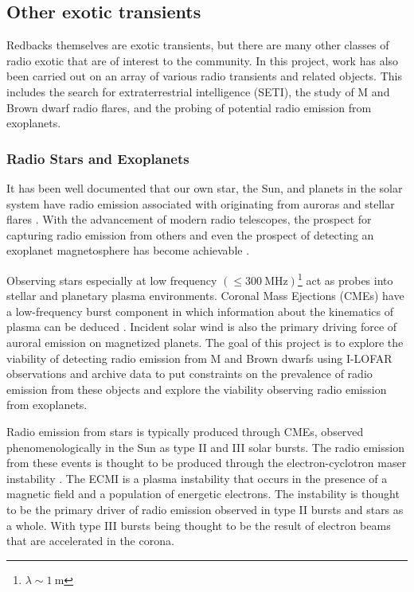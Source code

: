 \subsection{Other exotic transients}

Redbacks themselves are exotic transients, but there are many other classes of radio exotic that are of interest to the community. In this project, work has also been carried out on an array of various radio transients and related objects. This includes the search for extraterrestrial intelligence (SETI), the study of M and Brown dwarf radio flares, and the probing of potential radio emission from exoplanets.

\subsubsection{Radio Stars and Exoplanets}

It has been well documented that our own star, the Sun, and planets in the solar system have radio emission associated with originating from auroras and stellar flares \citep{murphy_lofar_2021, zarka_auroral_1998}. With the advancement of modern radio telescopes, the prospect for capturing radio emission from others and even the prospect of detecting an exoplanet magnetosphere has become achievable \citep{vedantham_coherent_2020}. \

Observing stars especially at low frequency $(\leq 300 \ \text{MHz})$\footnote{$\lambda \sim 1 \ \text{m}$} act as probes into stellar and planetary plasma environments. Coronal Mass Ejections (CMEs) have a low-frequency burst component in which information about the kinematics of plasma can be deduced \citep{villadsen_ultra-wideband_2019}. Incident solar wind is also the primary driving force of auroral emission on magnetized planets. The goal of this project is to explore the viability of detecting radio emission from M and Brown dwarfs using I-LOFAR observations and archive data to put constraints on the prevalence of radio emission from these objects and explore the viability observing radio emission from exoplanets. \

Radio emission from stars is typically produced through CMEs, observed phenomenologically in the Sun as type II and III solar bursts. The radio emission from these events is thought to be produced through the electron-cyclotron maser instability \citep[ECMI;][]{EMI}. The ECMI is a plasma instability that occurs in the presence of a magnetic field and a population of energetic electrons. The instability is thought to be the primary driver of radio emission observed in type II bursts and stars as a whole. With type III bursts being thought to be the result of electron beams that are accelerated in the corona. \

